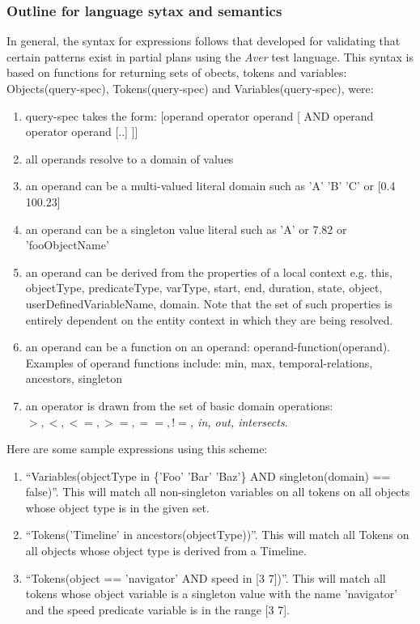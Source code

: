 \documentclass[10pt, letterpaper, oneside]{article}
\begin{document}
\subsubsection{Outline for language sytax and semantics}
In general, the syntax for expressions follows that developed for validating that certain patterns exist in partial plans using the {\em Aver} test language. This syntax is based on functions for returning sets of obects, tokens and variables: Objects(query-spec), Tokens(query-spec) and Variables(query-spec), were:
\begin{enumerate}
\item query-spec takes the form: [operand operator operand [ AND operand operator operand [..] ]]
\item all operands resolve to a domain of values
\item an operand can be a multi-valued literal domain such as {'A' 'B' 'C'} or [0.4 100.23]
\item an operand can be a singleton value literal such as 'A' or 7.82 or 'fooObjectName'
\item an operand can be derived from the properties of a local context e.g. this, objectType, predicateType, varType,  start, end, duration, state, object, userDefinedVariableName, domain. Note that the set of such properties is entirely dependent on the entity context in which they are being resolved.
\item an operand can be a function on an operand: operand-function(operand). Examples of operand functions include: min, max, temporal-relations, ancestors, singleton
\item an operator is drawn from the set of basic domain operations: {\em $>, <, <=, >=, ==, !=$, in, out, intersects}.
\end{enumerate}

Here are some sample expressions using this scheme:
\begin{enumerate}
\item ``Variables(objectType in \{'Foo' 'Bar' 'Baz'\} AND singleton(domain) == false)''. This will match all non-singleton variables on all tokens on all objects whose object type is in the given set.
\item ``Tokens('Timeline' in ancestors(objectType))''. This will match all Tokens on all objects whose object type is derived from a Timeline.
\item ``Tokens(object == 'navigator' AND speed in [3 7])''. This will match all tokens whose object variable is a singleton value with the name 'navigator' and the speed predicate variable is in the range [3 7].
\end{enumerate}
\end{document}
